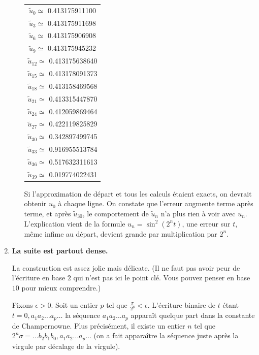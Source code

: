 \documentclass[class=report,crop=false]{standalone}
\begin{document}
\begin{enumerate}
\begin{enumerate}
\begin{center}
\setlength{\arrayrulewidth}{0.05mm}
\begin{tabular}{c} 
$\tilde{u}_0\simeq $    \num{0.413175911100} \\
$\tilde{u}_3\simeq $    \num{0.413175911698} \\
$\tilde{u}_6\simeq $    \num{0.413175906908} \\
$\tilde{u}_9\simeq $    \num{0.413175945232} \\
$\tilde{u}_{12}\simeq $ \num{0.413175638640} \\
$\tilde{u}_{15}\simeq $ \num{0.413178091373} \\
$\tilde{u}_{18}\simeq $ \num{0.413158469568} \\
$\tilde{u}_{21}\simeq $ \num{0.413315447870} \\
$\tilde{u}_{24}\simeq $ \num{0.412059869464} \\
$\tilde{u}_{27}\simeq $ \num{0.422119825829} \\
$\tilde{u}_{30}\simeq $ \num{0.342897499745} \\
$\tilde{u}_{33}\simeq $ \num{0.916955513784} \\
$\tilde{u}_{36}\simeq $ \num{0.517632311613} \\
$\tilde{u}_{39}\simeq $ \num{0.019774022431} \\
\end{tabular} 
\end{center} 

Si l'approximation de départ et tous les calculs étaient exacts, on devrait obtenir
$u_0$ à chaque ligne. On constate que l'erreur augmente terme après terme, 
et après $\tilde{u}_{30}$, le comportement de $\tilde{u}_{n}$ 
n'a plus rien à voir avec $u_n$.
L'explication vient de la formule $u_n =   \sin^2(2^n t)$, une erreur 
sur $t$, même infime au départ, devient grande par multiplication par $2^n$.

  \end{enumerate}
  
    
  \item \textbf{La suite est partout dense.}
  
  La construction est assez jolie mais délicate. (Il ne faut pas avoir peur de 
  l'écriture en base $2$ qui n'est pas ici le point clé. 
  Vous pouvez penser en base $10$ pour mieux comprendre.)
  
  
  Fixons $\epsilon >0$. Soit un entier $p$ tel que 
  $\frac{\pi}{2^p} < \epsilon$.
  L'écriture binaire de $t$ étant $t= 0,a_1 a_2 \ldots a_p \ldots$
  la séquence $a_1 a_2 \ldots a_p$ apparaît quelque part dans la constante de
  Champernowne. Plus précisément, il existe un entier $n$ tel que
  $2^n \sigma = \ldots b_2b_1b_0,a_1 a_2 \ldots a_p\ldots$
  (on a fait apparaître la séquence juste après la virgule par 
  décalage de la virgule).
  

\end{enumerate}
\end{document}
